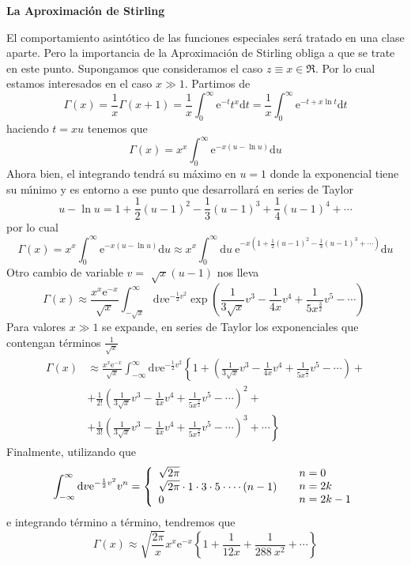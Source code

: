 \documentclass[spanish,notitlepage,letterpaper,12pt]{article}
\begin{document}
\begin{center}
\textbf{La Aproximaci\'{o}n de Stirling}
\end{center}

El comportamiento asint\'{o}tico de las funciones especiales ser\'{a} tratado
en una clase aparte. Pero la importancia de la Aproximaci\'{o}n de Stirling
obliga a que se trate en este punto. Supongamos que consideramos el caso
$z\equiv x\in\Re.$ Por lo cual estamos interesados en el caso $x\gg1. $
Partimos de
\[
\Gamma\left(  x\right)  =\frac1x\Gamma\left(  x+1\right)  =\frac1x\int
_{0}^{\infty}\mathrm{e}^{-t}t^{x}\mathrm{d}t=\frac1x\int_{0}^{\infty
}\mathrm{e}^{-t+x\ln t}\mathrm{d}t
\]
haciendo $t=xu$ tenemos que
\[
\Gamma\left(  x\right)  =x^{x}\int_{0}^{\infty}\mathrm{e}^{-x\left(  u-\ln
u\right)  }\mathrm{d}u
\]
Ahora bien, el integrando tendr\'{a} su m\'{a}ximo en $u=1$ donde la
exponencial tiene su m\'{\i}nimo y es entorno a ese punto que desarrollar\'{a}
en series de Taylor
\[
u-\ln u=1+\frac12\left(  u-1\right)  ^{2}-\frac13\left(  u-1\right)
^{3}+\frac14\left(  u-1\right)  ^{4}+\cdots
\]
por lo cual
\[
\Gamma\left(  x\right)  =x^{x}\int_{0}^{\infty}\mathrm{e}^{-x\left(  u-\ln
u\right)  }\mathrm{d}u\approx x^{x}\int_{0}^{\infty}\mathrm{d}u\ \mathrm{e}%
^{-x\left(  1+\frac12\left(  u-1\right)  ^{2}-\frac13\left(  u-1\right)
^{3}+\cdots\right)  }\mathrm{d}u
\]
Otro cambio de variable $v=$ $\sqrt{x}\left(  u-1\right)  $ nos lleva
\[
\Gamma\left(  x\right)  \approx\frac{x^{x}\mathrm{e}^{-x}}{\sqrt{x}}%
\int_{-\sqrt{x}}^{\infty}\mathrm{d}v\mathrm{e}^{-\frac12v^{2}}\exp\left(
\frac1{3\sqrt{x}}v^{3}-\frac1{4x}v^{4}+\frac1{5x^{\frac32}}v^{5}%
-\cdots\right)  \
\]
Para valores $x\gg1$ se expande, en series de Taylor los exponenciales que
contengan t\'{e}rminos $\frac1{\sqrt{x}}$%
\begin{align*}
\Gamma\left(  x\right)   & \approx\frac{x^{x}\mathrm{e}^{-x}}{\sqrt{x}}%
\int_{-\infty}^{\infty}\mathrm{d}v\mathrm{e}^{-\frac12v^{2}}\left\{  1+\left(
\frac1{3\sqrt{x}}v^{3}-\frac1{4x}v^{4}+\frac1{5x^{\frac32}}v^{5}%
-\cdots\right)  +\right. \\
& +\frac1{2!}\left(  \frac1{3\sqrt{x}}v^{3}-\frac1{4x}v^{4}+\frac
1{5x^{\frac32}}v^{5}-\cdots\right)  ^{2}+\\
& \left.  +\frac1{3!}\left(  \frac1{3\sqrt{x}}v^{3}-\frac1{4x}v^{4}%
+\frac1{5x^{\frac32}}v^{5}-\cdots\right)  ^{3}+\cdots\right\}
\end{align*}
Finalmente, utilizando que
\[
\int_{-\infty}^{\infty}\mathrm{d}v\mathrm{e}^{-\frac12v^{2}}v^{n}=\left\{
\begin{array}
[c]{l}%
\sqrt{2\pi}\qquad\\
\sqrt{2\pi}\cdot1\cdot3\cdot5\cdot\cdots(n-1)\\
0
\end{array}
\quad%
\begin{array}
[c]{l}%
n=0\\
n=2k\\
n=2k-1
\end{array}
\right.
\]
e integrando t\'{e}rmino a t\'{e}rmino, tendremos que
\[
\Gamma\left(  x\right)  \approx\sqrt{\frac{2\pi}x}x^{x}\mathrm{e}^{-x}\left\{
1+\frac1{12x}+\frac1{288\ x^{2}}+\cdots\right\}
\]
\end{document}
